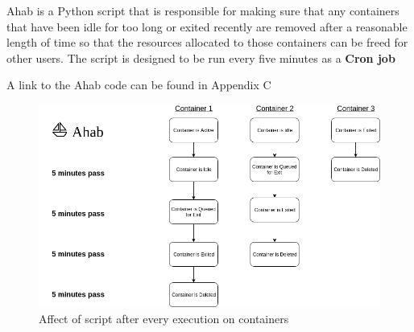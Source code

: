 Ahab is a Python script that is responsible for making sure that any containers that have been idle for too long or exited recently are removed after a reasonable length of time so that the resources allocated to those containers can be freed for other users. The script is designed to be run every five minutes as a \textbf{Cron job}

A link to the Ahab code can be found in Appendix C

\begin{figure}[h!]
    \centering
    \includegraphics[width=\linewidth]{res/Ahab.png}
    \caption{Affect of script after every execution on containers}
    \label{fig:ahab-diagram}
\end{figure}

\pagebreak
